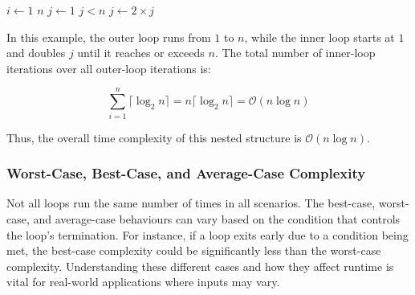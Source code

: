 \begin{example}

    \begin{codebox}
        \li \For $i \gets 1$ \To $n$ \Do
        \li     $j \gets 1$
        \li     \While $j < n$ \Do
        \li         {}
        \li         $j \gets 2 \times j$
                \End
            \End
    \end{codebox}

    In this example, the outer loop runs from $1$ to $n$, while the inner loop starts at $1$ and doubles $j$ until it reaches or exceeds $n$. The total number of inner-loop iterations over all outer-loop iterations is:

    \[
    \sum_{i=1}^{n} \lceil\log_2 n\rceil = n\lceil\log_2 n\rceil = \mathcal{O}(n \log n)
    \]

    Thus, the overall time complexity of this nested structure is $\mathcal{O}(n \log n)$.
\end{example}



\subsubsection*{Worst-Case, Best-Case, and Average-Case Complexity}
Not all loops run the same number of times in all scenarios. The best-case, worst-case, and average-case behaviours can vary based on the condition that controls the loop's termination. For instance, if a loop exits early due to a condition being met, the best-case complexity could be significantly less than the worst-case complexity. Understanding these different cases and how they affect runtime is vital for real-world applications where inputs may vary.


